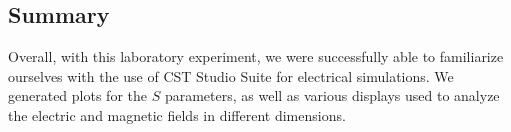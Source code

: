 \documentclass[
	letterpaper, %
	10pt, %
]{CSUniSchoolLabReport}
\begin{document}
\subsection{Summary}

Overall, with this laboratory experiment, we were successfully able to familiarize ourselves with the use of CST Studio Suite for electrical simulations. We generated plots for the $S$ parameters, as well as various displays used to analyze the electric and magnetic fields in different dimensions.
\end{document}
